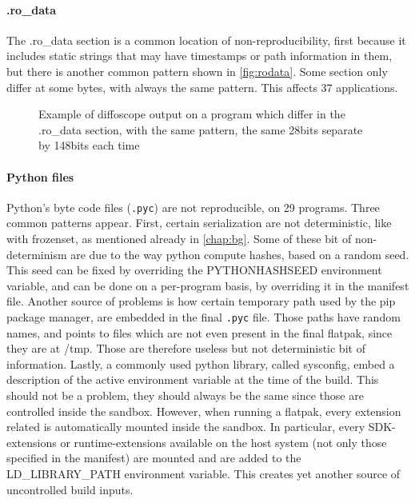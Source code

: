 \documentclass[a4paper,11pt,oneside]{report}
\theoremstyle{definition}
\newcommand{\fp}{flatpak\xspace}
\newcommand{\ldlp}{LD\_LIBRARY\_PATH\xspace}
\newcommand{\dfc}{diffoscope\xspace}
\begin{document}
\paragraph*{.ro\_data}
The .ro\_data section is a common location of non-reproducibility, first
because it includes static strings that may have timestamps or path information
in them, but there is another common pattern shown in \autoref{fig:rodata}.
Some section only differ at some bytes, with always the same pattern. This
affects 37 applications.
\begin{figure}[h]
    \caption{Example of \dfc output on a program which differ in the .ro\_data
    section, with the same pattern, the same 28bits separate by 148bits each
    time}
    \label{fig:rodata}
\end{figure}

\paragraph*{Python files}
Python's byte code files (\verb|.pyc|) are not reproducible, on 29 programs.
Three common patterns appear. First, certain serialization are not
deterministic, like with frozenset, as mentioned already in \autoref{chap:bg}.
Some of these bit of non-determinism are due to the way python compute hashes,
based on a random seed. This seed can be fixed by overriding the PYTHONHASHSEED
environment variable, and can be done on a per-program basis, by overriding it
in the manifest file. Another source of problems is how certain temporary path
used by the pip package manager, are embedded in the final \verb|.pyc| file.
Those paths have random names, and points to files which are not even present
in the final \fp, since they are at /tmp. Those are therefore useless but not
deterministic bit of information. Lastly, a commonly used python library,
called sysconfig, embed a description of the active environment variable at the
time of the build. This should not be a problem, they should always be the same
since those are controlled inside the sandbox. However, when running a \fp,
every extension related is automatically mounted inside the sandbox. In
particular, every SDK-extensions or runtime-extensions available on the host
system (not only those specified in the manifest) are mounted and are added to
the \ldlp environment variable. This creates yet another source of uncontrolled
build inputs.
\end{document}
